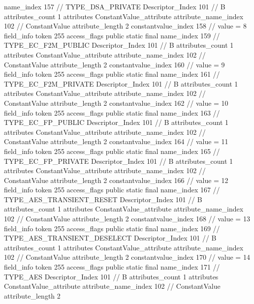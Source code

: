 {{{{{				name_index	157		// TYPE_DSA_PRIVATE
				Descriptor_Index	101		// B
				attributes_count	1
				attributes {
				ConstantValue_attribute {
					attribute_name_index	102		// ConstantValue
					attribute_length	2
					constantvalue_index	158		// value = 8
				}
				}
			}
			field_info {
				token	255
				access_flags	public static final
				name_index	159		// TYPE_EC_F2M_PUBLIC
				Descriptor_Index	101		// B
				attributes_count	1
				attributes {
				ConstantValue_attribute {
					attribute_name_index	102		// ConstantValue
					attribute_length	2
					constantvalue_index	160		// value = 9
				}
				}
			}
			field_info {
				token	255
				access_flags	public static final
				name_index	161		// TYPE_EC_F2M_PRIVATE
				Descriptor_Index	101		// B
				attributes_count	1
				attributes {
				ConstantValue_attribute {
					attribute_name_index	102		// ConstantValue
					attribute_length	2
					constantvalue_index	162		// value = 10
				}
				}
			}
			field_info {
				token	255
				access_flags	public static final
				name_index	163		// TYPE_EC_FP_PUBLIC
				Descriptor_Index	101		// B
				attributes_count	1
				attributes {
				ConstantValue_attribute {
					attribute_name_index	102		// ConstantValue
					attribute_length	2
					constantvalue_index	164		// value = 11
				}
				}
			}
			field_info {
				token	255
				access_flags	public static final
				name_index	165		// TYPE_EC_FP_PRIVATE
				Descriptor_Index	101		// B
				attributes_count	1
				attributes {
				ConstantValue_attribute {
					attribute_name_index	102		// ConstantValue
					attribute_length	2
					constantvalue_index	166		// value = 12
				}
				}
			}
			field_info {
				token	255
				access_flags	public static final
				name_index	167		// TYPE_AES_TRANSIENT_RESET
				Descriptor_Index	101		// B
				attributes_count	1
				attributes {
				ConstantValue_attribute {
					attribute_name_index	102		// ConstantValue
					attribute_length	2
					constantvalue_index	168		// value = 13
				}
				}
			}
			field_info {
				token	255
				access_flags	public static final
				name_index	169		// TYPE_AES_TRANSIENT_DESELECT
				Descriptor_Index	101		// B
				attributes_count	1
				attributes {
				ConstantValue_attribute {
					attribute_name_index	102		// ConstantValue
					attribute_length	2
					constantvalue_index	170		// value = 14
				}
				}
			}
			field_info {
				token	255
				access_flags	public static final
				name_index	171		// TYPE_AES
				Descriptor_Index	101		// B
				attributes_count	1
				attributes {
				ConstantValue_attribute {
					attribute_name_index	102		// ConstantValue
					attribute_length	2
}}}}}}}
